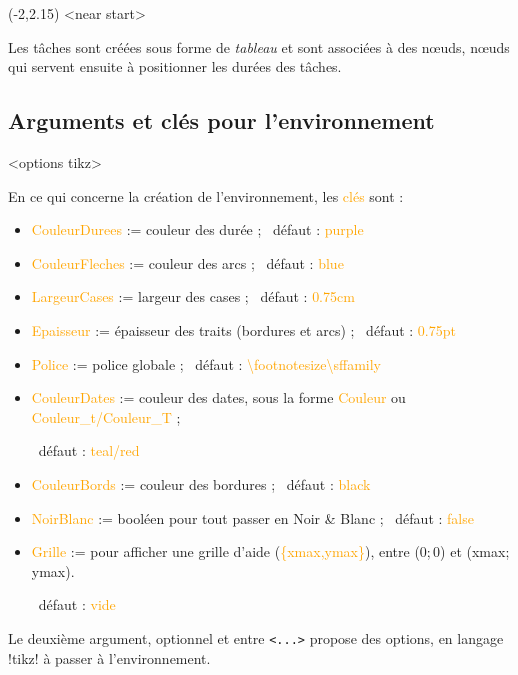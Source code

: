 \documentclass[french,a4paper,11pt]{article}
\newcommand\Cle[1]{{\small\sffamily\textlangle \textcolor{orange}{#1}\textrangle}}
\begin{document}
\begin{DemoCode}[]
\begin{GrapheMPM}
	\MPMPlaceNotice(-2,2.15)
	<near start>
\end{GrapheMPM}
\end{DemoCode}

\begin{tipblock}
Les tâches sont créées sous forme de \textit{tableau} et sont associées à des nœuds, nœuds qui servent ensuite à positionner les durées des tâches.
\end{tipblock}

\pagebreak

\subsection{Arguments et clés pour l'environnement}

\begin{DemoCode}
\begin{GrapheMPM}[clés]<options tikz>
\end{GrapheMPM}
\end{DemoCode}

\begin{tipblock}
En ce qui concerne la création de l'environnement, les \Cle{clés} sont :

\begin{itemize}
	\item \Cle{CouleurDurees} := couleur des durée ; \hfill~défaut : \Cle{purple}
	\item \Cle{CouleurFleches} := couleur des arcs ; \hfill~défaut : \Cle{blue}
	\item \Cle{LargeurCases} := largeur des cases ; \hfill~défaut : \Cle{0.75cm}
	\item \Cle{Epaisseur} := épaisseur des traits (bordures et arcs) ; \hfill~défaut : \Cle{0.75pt}
	\item \Cle{Police} := police globale ; \hfill~défaut : \Cle{\textbackslash footnotesize\textbackslash sffamily}
	\item \Cle{CouleurDates} := couleur des dates, sous la forme \Cle{Couleur} ou \Cle{Couleur\_t/Couleur\_T} ;
	
	\hfill~défaut : \Cle{teal/red}
	\item \Cle{CouleurBords} := couleur des bordures ; \hfill~défaut : \Cle{black}
	\item \Cle{NoirBlanc} := booléen pour tout passer en Noir \&{} Blanc ; \hfill~défaut : \Cle{false}
	\item \Cle{Grille} := pour afficher une grille d'aide (\Cle{\{xmax,ymax\}}), entre (0;\,0) et (xmax;\,ymax).
	
	\hfill~défaut : \Cle{vide}
\end{itemize}

Le deuxième argument, optionnel et entre \texttt{<...>} propose des options, en langage \packagetex!tikz! à passer à l'environnement.
\end{tipblock}
\end{document}
